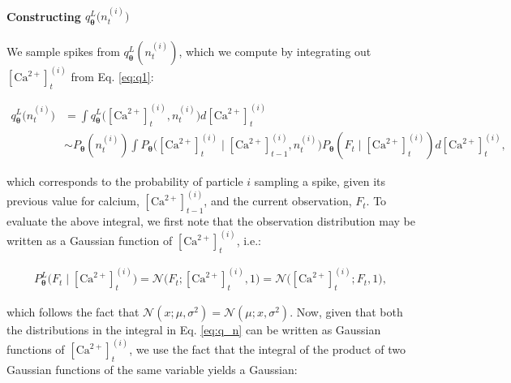 \documentclass[10pt]{article}
\providecommand{\ve}[1]{\boldsymbol{#1}}
\providecommand{\ve}[1]{\boldsymbol{#1}}
\newcommand{\thetn}{\ve{\theta}}
\newcommand{\p}{P_{\thetn}}
\newcommand{\Ca}{[\text{Ca}^{2+}]}
\begin{document}
\paragraph{Constructing $q_{\thetn}^L\big(n_t^{(i)}\big)$}

We sample spikes from $q_{\thetn}^L(n_t^{(i)})$, which we compute by integrating out $\Ca_t^{(i)}$ from Eq. \ref{eq:q1}:

\begin{subequations}
\begin{align}
q_{\thetn}^L\big(n_t^{(i)}\big) &= \int q_{\thetn}^L\big(\Ca_t^{(i)}, n_t^{(i)}) d\Ca_t^{(i)}
\\ &\sim \p(n_t^{(i)}) \int \p \big( \Ca_t^{(i)} \mid \Ca^{(i)}_{t-1}, n_t^{(i)} \big) \p(F_t \mid \Ca_t^{(i)}) d\Ca_t^{(i)}, \label{eq:q_n}
\end{align}
\end{subequations}

%

\noindent which corresponds to the probability of particle $i$ sampling a spike, given its previous value for calcium, $\Ca_{t-1}^{(i)}$, and the current observation, $F_t$.  To evaluate the above integral, we first note that the observation distribution may be written as a Gaussian function of $\Ca_t^{(i)}$, i.e.:

\begin{align} \label{eq:obs_gauss}
\p^L \big(F_t \mid \Ca_t^{(i)}\big) = \mathcal{N}\big(F_t; \Ca_t^{(i)}, 1 \big) = \mathcal{N}\big(\Ca_t^{(i)}; F_t, 1\big),
\end{align}

\noindent which follows the fact that $\mathcal{N}(x;\mu,\sigma^2)=\mathcal{N}(\mu;x,\sigma^2)$. Now, given that both the distributions in the integral in Eq. \ref{eq:q_n} can be written as Gaussian functions of $\Ca_t^{(i)}$, we use the fact that the integral of the product of two Gaussian functions of the same variable yields a Gaussian:
\end{document}
